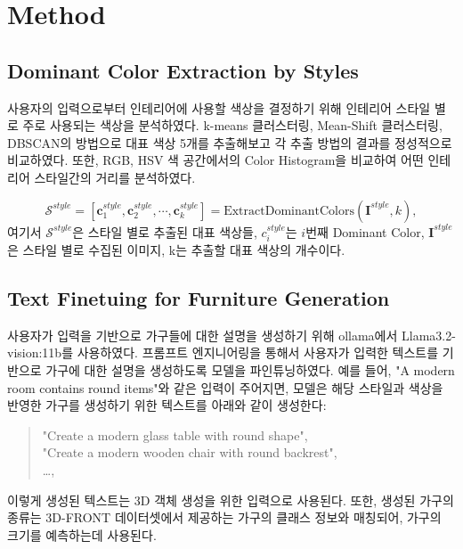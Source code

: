 \documentclass[11pt]{article}
\begin{document}
\section{Method}
\subsection{Dominant Color Extraction by Styles}
사용자의 입력으로부터 인테리어에 사용할 색상을 결정하기 위해 인테리어 스타일 별로 주로 사용되는 색상을 분석하였다. 
k-means 클러스터링, Mean-Shift 클러스터링, DBSCAN의 방법으로 대표 색상 5개를 추출해보고 각 추출 방법의 결과를 정성적으로 비교하였다.
또한, RGB, HSV 색 공간에서의 Color Histogram을 비교하여 어떤 인테리어 스타일간의 거리를 분석하였다.

\begin{equation}
    \label{eq:color_extraction}
    \mathcal{S}^{style} = \left[ \mathbf{c}^{style}_1, \mathbf{c}^{style}_2, \cdots , \mathbf{c}^{style}_k \right]= \text{ExtractDominantColors}(\mathbf{I}^{style}, k) ,
\end{equation}
여기서 $\mathcal{S}^{style}$은 스타일 별로 추출된 대표 색상들, $c^{style}_i$는 $i$번째 Dominant Color, $\mathbf{I}^{style}$은 스타일 별로 수집된 이미지, k는 추출할 대표 색상의 개수이다.

\subsection{Text Finetuing for Furniture Generation}
사용자가 입력을 기반으로 가구들에 대한 설명을 생성하기 위해 ollama에서 Llama3.2-vision:11b\cite{touvron2024llama3}를 사용하였다. 프롬프트 엔지니어링을 통해서 사용자가 입력한 텍스트를 기반으로 가구에 대한 설명을 생성하도록 모델을 파인튜닝하였다. 
예를 들어, "A modern room contains round items"와 같은 입력이 주어지면, 모델은 해당 스타일과 색상을 반영한 가구를 생성하기 위한 텍스트를 아래와 같이 생성한다:
\begin{quote}
    "Create a modern glass table with round shape", \\
    "Create a modern wooden chair with round backrest", \\
    \dots,
\end{quote}
이렇게 생성된 텍스트는 3D 객체 생성을 위한 입력으로 사용된다. 또한, 생성된 가구의 종류는 3D-FRONT 데이터셋에서 제공하는 가구의 클래스 정보와 매칭되어, 가구의 크기를 예측하는데 사용된다.
\end{document}

